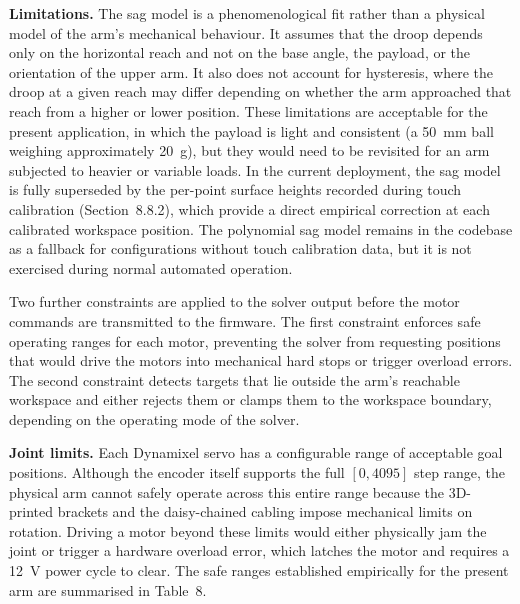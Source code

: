 \textbf{Limitations.} The sag model is a phenomenological fit 
rather than a physical model of the arm's mechanical behaviour. 
It assumes that the droop depends only on the horizontal reach 
and not on the base angle, the payload, or the orientation of 
the upper arm. It also does not account for hysteresis, where 
the droop at a given reach may differ depending on whether the 
arm approached that reach from a higher or lower position. These 
limitations are acceptable for the present application, in which 
the payload is light and consistent (a 50~mm ball weighing 
approximately 20~g), but they would need to be revisited for an 
arm subjected to heavier or variable loads. In the current 
deployment, the sag model is fully superseded by the per-point 
surface heights recorded during touch calibration 
(Section~8.8.2), which provide a direct empirical correction at 
each calibrated workspace position. The polynomial sag model 
remains in the codebase as a fallback for configurations 
without touch calibration data, but it is not exercised during 
normal automated operation.


Two further constraints are applied to the solver output before 
the motor commands are transmitted to the firmware. The first 
constraint enforces safe operating ranges for each motor, 
preventing the solver from requesting positions that would drive 
the motors into mechanical hard stops or trigger overload errors. 
The second constraint detects targets that lie outside the arm's 
reachable workspace and either rejects them or clamps them to the 
workspace boundary, depending on the operating mode of the 
solver.

\textbf{Joint limits.} Each Dynamixel servo has a configurable 
range of acceptable goal positions. Although the encoder itself 
supports the full $[0, 4095]$ step range, the physical arm 
cannot safely operate across this entire range because the 
3D-printed brackets and the daisy-chained cabling impose 
mechanical limits on rotation. Driving a motor beyond these 
limits would either physically jam the joint or trigger a 
hardware overload error, which latches the motor and requires a 
12~V power cycle to clear. The safe ranges established 
empirically for the present arm are summarised in Table~8.

